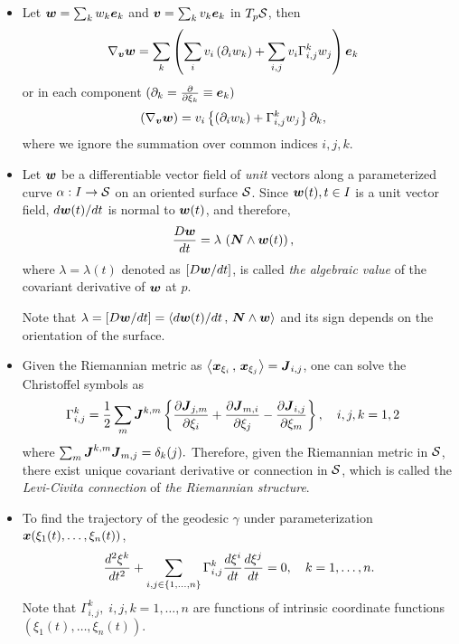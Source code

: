 \documentclass[11pt]{article}
\begin{document}
\begin{itemize}
\item Let $\boldsymbol{w} = \sum_{k}w_{k}\boldsymbol{e}_{k}$ and $\boldsymbol{v} = \sum_{k}v_{k}\boldsymbol{e}_{k}$ in $T_{p}{\mathcal S}$, then 
\begin{align*}
\nabla_{\boldsymbol{v}}\boldsymbol{w} &=\sum_{k} \left( \sum_{i}v_{i}\left(\partial_{i}w_{k}\right) + \sum_{i,j}v_{i}\Gamma_{i,j}^{k}w_{j} \right)\boldsymbol{e}_{k}
\end{align*}
or in each component $(\partial_{k} = \frac{\partial }{ \partial \xi_{k}}\equiv \boldsymbol{e}_{k})$
\begin{align*}
(\nabla_{\boldsymbol{v}}\boldsymbol{w}) &= v_{i}\left\{\left(\partial_{i}w_{k}\right) + \Gamma_{i,j}^{k}w_{j}\right\}\partial_{k},
\end{align*}
where we ignore the summation over common indices $i,j,k$. \\




\item Let $\boldsymbol{w}$ be a differentiable vector field of \emph{unit} vectors along a parameterized curve $\alpha: I \rightarrow {\mathcal S}$ on an oriented surface ${\mathcal S}$. Since $\boldsymbol{w}(t), t\in I$ is a unit vector field, $d\boldsymbol{w}(t)/dt$ is normal to $\boldsymbol{w}(t)$, and therefore, 
\begin{align*}
\frac{D\boldsymbol{w}}{dt} &= \lambda\,\left(\boldsymbol{N} \wedge \boldsymbol{w}(t)\right),
\end{align*} 
where $\lambda = \lambda(t)$ denoted as $\left[D\boldsymbol{w}/dt\right]$, is called \emph{the algebraic value} of the covariant derivative of $\boldsymbol{w}$ at $p$.

Note that $\lambda = \left[D\boldsymbol{w}/dt\right] = \left\langle d\boldsymbol{w}(t)/dt\,,\, \boldsymbol{N} \wedge \boldsymbol{w} \right\rangle$ and its sign depends on the orientation of the surface. 



\item Given the Riemannian metric as $\left\langle \boldsymbol{x}_{\xi_{i}}\,,\, \boldsymbol{x}_{\xi_{j}} \right\rangle = \boldsymbol{J}_{i,j}$, one can solve the Christoffel symbols as 
\begin{align}
\Gamma_{i,j}^{k} &= \frac{1}{2}\sum_{m}\boldsymbol{J}^{k,m}\left\{\frac{\partial \boldsymbol{J}_{j,m}}{ \partial \xi_{i}}+ \frac{\partial \boldsymbol{J}_{m,i}}{ \partial \xi_{j}}  - \frac{\partial \boldsymbol{J}_{i,j}}{ \partial \xi_{m}}\right\}, \quad i,j,k=1,2 \label{eqn: Christoffel_metric_expr}
\end{align}
where $\sum_{m}\boldsymbol{J}^{k,m}\boldsymbol{J}_{m,j}=\delta_{k}(j).$
Therefore, given the Riemannian metric in ${\mathcal S}$, there exist unique covariant derivative or connection in ${\mathcal S}$, which is called the \emph{Levi-Civita connection} of \emph{the Riemannian structure}.  \\[10pt]

\item To find the trajectory of the geodesic $\gamma$ under parameterization $\boldsymbol{x}(\xi_{1}(t),\ldots, \xi_{n}(t))$, 
\begin{align}
\frac{d^{2} \xi^{k}}{dt^{2}} + \sum_{i,j \in \left\{1,\ldots,n\right\}}\Gamma_{i,j}^{k}\frac{d\xi^{i}}{dt}\frac{d\xi^{j}}{dt} = 0, \quad k=1,\ldots, n.\label{eqn: geo_diff_eqn_high}
\end{align}
Note that $\Gamma_{i,j}^{k},\; i,j,k=1,\ldots,n$ are functions of intrinsic coordinate functions $(\xi_{1}(t),\ldots, \xi_{n}(t)).$\\[10pt]


\end{itemize}
\end{document}
